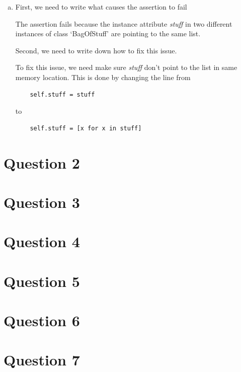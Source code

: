 \documentclass[12pt]{article}
\begin{document}
\begin{enumerate}[a.]
    \item

    First, we need to write what causes the assertion to fail

    \bigskip

    The assertion fails because the instance attribute \textit{stuff} in two
    different instances of class `BagOfStuff' are pointing to the same list.

    \bigskip

    Second, we need to write down how to fix this issue.

    \bigskip

    To fix this issue, we need make sure \textit{stuff} don't point to the list in
    same memory location. This is done by changing the line from

    \bigskip

    \begin{lstlisting}
    self.stuff = stuff
    \end{lstlisting}

    to

    \begin{lstlisting}
    self.stuff = [x for x in stuff]
    \end{lstlisting}



\end{enumerate}

\section*{Question 2}

\section*{Question 3}

\section*{Question 4}

\section*{Question 5}

\section*{Question 6}

\section*{Question 7}
\end{document}
